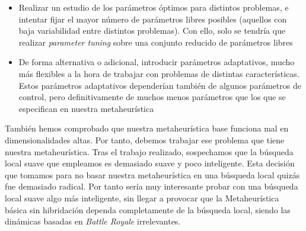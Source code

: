 \documentclass[11pt]{article}
\begin{document}
\begin{itemize}
    \item Realizar un estudio de los parámetros óptimos para distintos problemas, e intentar fijar el mayor número de parámetros libres posibles (aquellos con baja variabilidad entre distintos problemas). Con ello, solo se tendría que realizar \emph{parameter tuning} sobre una conjunto reducido de parámetros libres
    \item De forma alternativa o adicional, introducir parámetros adaptativos, mucho más flexibles a la hora de trabajar con problemas de distintas características. Estos parámetros adaptativos dependerían también de algunos parámetros de control, pero definitivamente de muchos menos parámetros que los que se especifican en nuestra metaheurística
\end{itemize}

También hemos comprobado que nuestra metaheurística base funciona mal en dimensionalidades altas. Por tanto, debemos trabajar ese problema que tiene nuestra metaheurística. Tras el trabajo realizado, sospechamos que la búsqueda local suave que empleamos es demasiado suave y poco inteligente. Esta decisión que tomamos para no basar nuestra metaheurística en una búsqueda local quizás fue demasiado radical. Por tanto sería muy interesante probar con una búsqueda local suave algo más inteligente, sin llegar a provocar que la Metaheurística básica sin hibridación dependa completamente de la búsqueda local, siendo las dinámicas basadas en \emph{Battle Royale} irrelevantes.

\pagebreak



\end{document}
